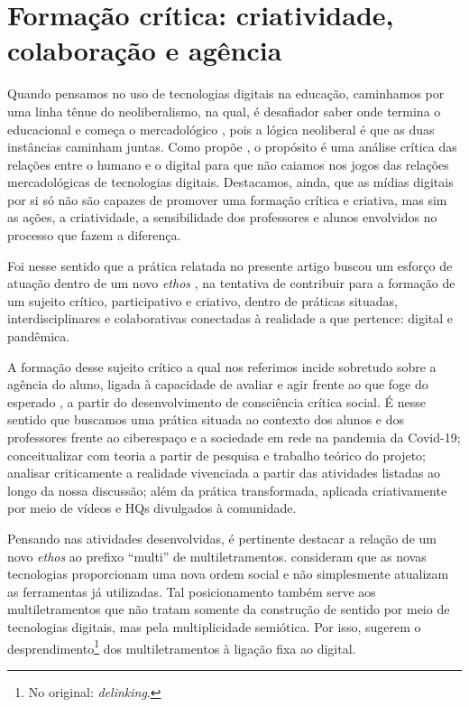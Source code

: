 \section{Formação crítica: criatividade, colaboração e agência}\label{sec-formaçãocrítica-criatividade}

Quando pensamos no uso de tecnologias digitais na educação, caminhamos por uma linha tênue do neoliberalismo, na qual, é desafiador saber onde termina o educacional e começa o mercadológico \cite{ball_nova_2014}, pois a lógica neoliberal é que as duas instâncias caminham juntas. Como propõe \textcite{buzato_inteligencia_2023}, o propósito é uma análise crítica das relações entre o humano e o digital para que não caiamos nos jogos das relações mercadológicas de tecnologias digitais. Destacamos, ainda, que as mídias digitais por si só não são capazes de promover uma formação crítica e criativa, mas sim as ações, a criatividade, a sensibilidade dos professores e alunos envolvidos no processo que fazem a diferença.

Foi nesse sentido que a prática relatada no presente artigo buscou um esforço de atuação dentro de um novo \textit{ethos} \cite{knobel_new_2007}, na tentativa de contribuir para a formação de um sujeito crítico, participativo e criativo, dentro de práticas situadas, interdisciplinares e colaborativas conectadas à realidade a que pertence: digital e pandêmica.

A formação desse sujeito crítico a qual nos referimos incide sobretudo sobre  a agência do aluno, ligada à capacidade de avaliar e agir frente ao que foge do esperado \cite[p. 1]{monte_mor_development_2013}, a partir do desenvolvimento de consciência crítica social. É nesse sentido que buscamos uma prática situada ao contexto dos alunos e dos professores frente ao ciberespaço e a sociedade em rede na pandemia da Covid-19; conceitualizar com teoria a partir de pesquisa e trabalho teórico do projeto; analisar criticamente a realidade vivenciada a partir das atividades listadas ao longo da nossa discussão; além da prática transformada, aplicada criativamente por meio de vídeos e HQs divulgados à comunidade.

Pensando nas atividades desenvolvidas, é pertinente destacar a relação de um novo \textit{ethos} \cite{knobel_new_2007} ao prefixo “multi” de multiletramentos. \textcite{knobel_new_2007} consideram que as novas tecnologias proporcionam uma nova ordem social e não simplesmente atualizam as ferramentas já utilizadas. Tal posicionamento também serve aos multiletramentos que não tratam somente da construção de sentido por meio de tecnologias digitais, mas pela multiplicidade semiótica. Por isso, \textcite{duboc_delinking_2021} sugerem o {\textquotedbl}desprendimento{\textquotedbl}\footnote{ No original: \textit{delinking}.} dos multiletramentos à ligação fixa ao digital.


